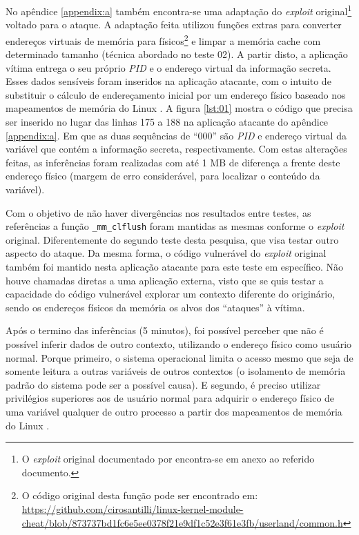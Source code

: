 \documentclass[
	article,			    %
	12pt,				    %
	oneside,			    %
	a4paper,			    %
	chapter=TITLE,		    %
	section=TITLE,		    %
	subsection=TITLE,	    %
	english,			    %
	brazil,				    %
	sumario=tradicional
]{abntex2}
\begin{document}
No apêndice \ref{appendix:a} também encontra-se uma adaptação do \emph{exploit} original\footnote{O \emph{exploit} original documentado por  encontra-se em anexo ao referido documento.} voltado para o ataque. A adaptação feita utilizou funções extras para converter endereços virtuais de memória para físicos\footnote{O código original desta função pode ser encontrado em: \url{https://github.com/cirosantilli/linux-kernel-module-cheat/blob/873737bd1fc6e5ee0378f21e9df1c52e3f61e3fb/userland/common.h}} e limpar a memória cache com determinado tamanho (técnica abordado no teste 02). A partir disto, a aplicação vítima entrega o seu próprio \emph{PID} e o endereço virtual da informação secreta. Esses dados sensíveis foram inseridos na aplicação atacante, com o intuito de substituir o cálculo de endereçamento inicial por um endereço físico baseado nos mapeamentos de memória do Linux \cite{EQWARE2009Capturing}. A figura \ref{lst:01} mostra o código que precisa ser inserido no lugar das linhas 175 a 188 na aplicação atacante do apêndice \ref{appendix:a}. Em que as duas sequências de ``000'' são \emph{PID} e endereço virtual da variável que contém a informação secreta, respectivamente. Com estas alterações feitas, as inferências foram realizadas com até 1 MB de diferença a frente deste endereço físico (margem de erro considerável, para localizar o conteúdo da variável).

Com o objetivo de não haver divergências nos resultados entre testes, as referências a função \lstinline[language=C, style=c]{_mm_clflush} foram mantidas as mesmas conforme o \emph{exploit} original. Diferentemente do segundo teste desta pesquisa, que visa testar outro aspecto do ataque. Da mesma forma, o código vulnerável do \emph{exploit} original também foi mantido nesta aplicação atacante para este teste em específico. Não houve chamadas diretas a uma aplicação externa, visto que se quis testar a capacidade do código vulnerável explorar um contexto diferente do originário, sendo os endereços físicos da memória os alvos dos ``ataques'' à vítima.



Após o termino das inferências (5 minutos), foi possível perceber que não é possível inferir dados de outro contexto, utilizando o endereço físico como usuário normal. Porque primeiro, o sistema operacional limita o acesso mesmo que seja de somente leitura a outras variáveis de outros contextos (o isolamento de memória padrão do sistema pode ser a possível causa). E segundo, é preciso utilizar privilégios superiores aos de usuário normal para adquirir o endereço físico de uma variável qualquer de outro processo a partir dos mapeamentos de memória do Linux \cite{EQWARE2009Capturing}.
\end{document}
